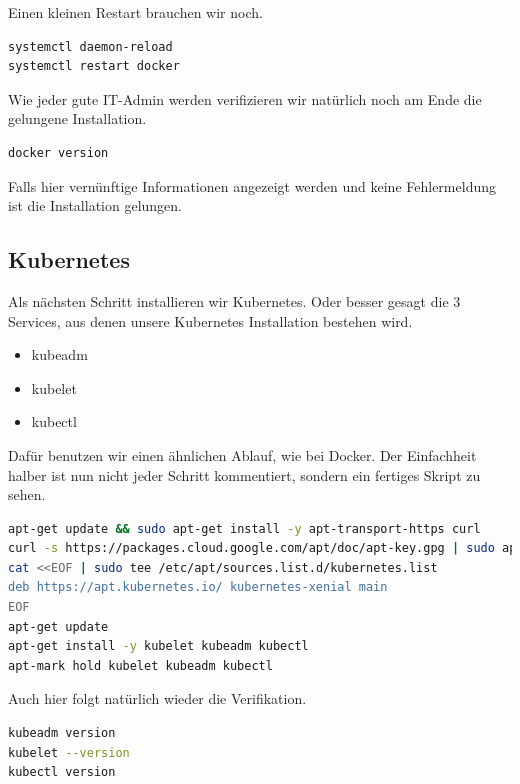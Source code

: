 Einen kleinen Restart brauchen wir noch.

\begin{lstlisting}[language=Bash]
systemctl daemon-reload
systemctl restart docker
\end{lstlisting}

Wie jeder gute IT-Admin werden verifizieren wir natürlich noch am Ende
die gelungene Installation.

\begin{lstlisting}[language=Bash]
docker version
\end{lstlisting}

Falls hier vernünftige Informationen angezeigt werden und keine
Fehlermeldung ist die Installation gelungen.

\hypertarget{kubernetes-1}{%
\subsection{Kubernetes}\label{kubernetes-1}}

Als nächsten Schritt installieren wir Kubernetes. Oder besser gesagt die
3 Services, aus denen unsere Kubernetes Installation bestehen wird.

\begin{itemize}
\tightlist
\item
  kubeadm
\item
  kubelet
\item
  kubectl
\end{itemize}

Dafür benutzen wir einen ähnlichen Ablauf, wie bei Docker. Der
Einfachheit halber ist nun nicht jeder Schritt kommentiert, sondern ein
fertiges Skript zu sehen.

\begin{lstlisting}[language=Bash]
apt-get update && sudo apt-get install -y apt-transport-https curl
curl -s https://packages.cloud.google.com/apt/doc/apt-key.gpg | sudo apt-key add -
cat <<EOF | sudo tee /etc/apt/sources.list.d/kubernetes.list
deb https://apt.kubernetes.io/ kubernetes-xenial main
EOF
apt-get update
apt-get install -y kubelet kubeadm kubectl
apt-mark hold kubelet kubeadm kubectl
\end{lstlisting}

Auch hier folgt natürlich wieder die Verifikation.

\begin{lstlisting}[language=Bash]
kubeadm version
kubelet --version
kubectl version
\end{lstlisting}

